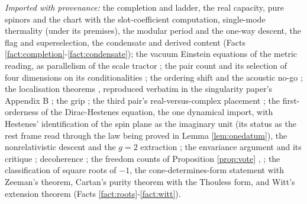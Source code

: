\documentclass[11pt]{article}
\theoremstyle{definition}
\begin{document}
\emph{Imported with provenance:} the completion and ladder, the real capacity, pure spinors and the chart with the slot-coefficient computation, single-mode thermality (under its premises), the modular period and the one-way descent, the flag and superselection, the condensate and derived content (Facts \ref{fact:completion}-\ref{fact:condensate}); the vacuum Einstein equations of the metric reading, as parallelism of the scale tractor \cite[Thm.~4.5]{ButlerT6}; the pair count and its selection of four dimensions on its conditionalities \cite[Lem.~2.12, Prop.~4.3]{ButlerT12}; the ordering shift \cite[Prop.~5.6]{ButlerT9} and the acoustic no-go \cite[Prop.~5.2]{ButlerT10}; the localisation theorems \cite[Thm.~4.4, Cor.~4.5, Thm.~8.12]{ButlerT4}, reproduced verbatim in the singularity paper's Appendix B \cite{ButlerT5}; the grip \cite[Def.~5.4, Thm.~5.6]{ButlerT11}; the third pair's real-versus-complex placement \cite[Fact~2.9]{ButlerT14}; the first-orderness of the Dirac-Hestenes equation, the one dynamical import, with Hestenes' identification of the spin plane as the imaginary unit (its status as the rest frame read through the law being proved in Lemma \ref{lem:onedatum}), the nonrelativistic descent and the $g = 2$ extraction \cite{Hestenes1967, Hestenes1975}; the envariance argument and its critique \cite{Zurek2005}; decoherence \cite{Zeh1970, JoosZeh1985}; the freedom counts of Proposition \ref{prop:vote} \cite[Prop.~7.6]{ButlerT12}, \cite[Prop.~5.1, Prop.~5.2]{ButlerT14}; the classification of square roots of $-1$, the cone-determines-form statement with Zeeman's theorem, Cartan's purity theorem with the Thouless form, and Witt's extension theorem (Facts \ref{fact:roots}-\ref{fact:witt}).
\end{document}
